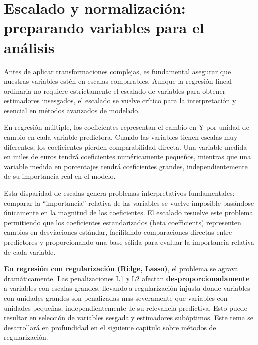\documentclass[
  letterpaper,
  DIV=11,
  numbers=noendperiod]{scrreprt}
\begin{document}
\section{Escalado y normalización: preparando variables para el
análisis}\label{escalado-y-normalizaciuxf3n-preparando-variables-para-el-anuxe1lisis}

Antes de aplicar transformaciones complejas, es fundamental asegurar que
nuestras variables estén en escalas comparables. Aunque la regresión
lineal ordinaria no requiere estrictamente el escalado de variables para
obtener estimadores insesgados, el escalado se vuelve crítico para la
interpretación y esencial en métodos avanzados de modelado.

En regresión múltiple, los coeficientes representan el cambio en Y por
unidad de cambio en cada variable predictora. Cuando las variables
tienen escalas muy diferentes, los coeficientes pierden comparabilidad
directa. Una variable medida en miles de euros tendrá coeficientes
numéricamente pequeños, mientras que una variable medida en porcentajes
tendrá coeficientes grandes, independientemente de su importancia real
en el modelo.

Esta disparidad de escalas genera problemas interpretativos
fundamentales: comparar la ``importancia'' relativa de las variables se
vuelve imposible basándose únicamente en la magnitud de los
coeficientes. El escalado resuelve este problema permitiendo que los
coeficientes estandarizados (beta coefficients) representen cambios en
desviaciones estándar, facilitando comparaciones directas entre
predictores y proporcionando una base sólida para evaluar la importancia
relativa de cada variable.

\begin{tcolorbox}[enhanced jigsaw, breakable, toprule=.15mm, bottomtitle=1mm, coltitle=black, colbacktitle=quarto-callout-note-color!10!white, titlerule=0mm, opacitybacktitle=0.6, bottomrule=.15mm, toptitle=1mm, title=\textcolor{quarto-callout-note-color}{\faInfo}\hspace{0.5em}{Escalado en métodos de regularización}, arc=.35mm, rightrule=.15mm, opacityback=0, colframe=quarto-callout-note-color-frame, leftrule=.75mm, left=2mm, colback=white]

\textbf{En regresión con regularización (Ridge, Lasso)}, el problema se
agrava dramáticamente. Las penalizaciones L1 y L2 afectan
\textbf{desproporcionadamente} a variables con escalas grandes, llevando
a regularización injusta donde variables con unidades grandes son
penalizadas más severamente que variables con unidades pequeñas,
independientemente de su relevancia predictiva. Esto puede resultar en
selección de variables sesgada y estimadores subóptimos. Este tema se
desarrollará en profundidad en el siguiente capítulo sobre métodos de
regularización.

\end{tcolorbox}
\end{document}
